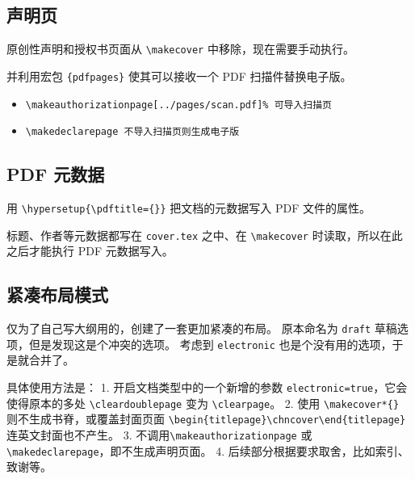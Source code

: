\documentclass[../Main/thesis.tex]{subfiles}
\begin{document}
\subsection{声明页}

原创性声明和授权书页面从 \texttt{\textbackslash{}makecover}
中移除，现在需要手动执行。

并利用宏包 \texttt{\{pdfpages\}} 使其可以接收一个 PDF 扫描件替换电子版。

\begin{itemize}
\item
  \texttt{\textbackslash{}makeauthorizationpage{[}../pages/scan.pdf{]}\%\ 可导入扫描页}
\item
  \texttt{\textbackslash{}makedeclarepage\ 不导入扫描页则生成电子版}
\end{itemize}

\begin{Shaded}
\end{Shaded}

\subsection{PDF 元数据}

用 \texttt{\textbackslash{}hypersetup\{\textbackslash{}pdftitle=\{\}\}}
把文档的元数据写入 PDF 文件的属性。

标题、作者等元数据都写在 \texttt{cover.tex} 之中、在
\texttt{\textbackslash{}makecover} 时读取，所以在此之后才能执行 PDF
元数据写入。

\subsection{紧凑布局模式}

仅为了自己写大纲用的，创建了一套更加紧凑的布局。 原本命名为
\texttt{draft} 草稿选项，但是发现这是个冲突的选项。 考虑到
\texttt{electronic} 也是个没有用的选项，于是就合并了。

具体使用方法是： 1. 开启文档类型中的一个新增的参数
\texttt{electronic=true}，它会使得原本的多处
\texttt{\textbackslash{}cleardoublepage} 变为
\texttt{\textbackslash{}clearpage}。 2. 使用
\texttt{\textbackslash{}makecover*\{\}} 则不生成书脊，或覆盖封面页面
\texttt{\textbackslash{}begin\{titlepage\}\textbackslash{}chncover\textbackslash{}end\{titlepage\}}
连英文封面也不产生。 3.
不调用\texttt{\textbackslash{}makeauthorizationpage} 或
\texttt{\textbackslash{}makedeclarepage}，即不生成声明页面。 4.
后续部分根据要求取舍，比如索引、致谢等。
\end{document}
